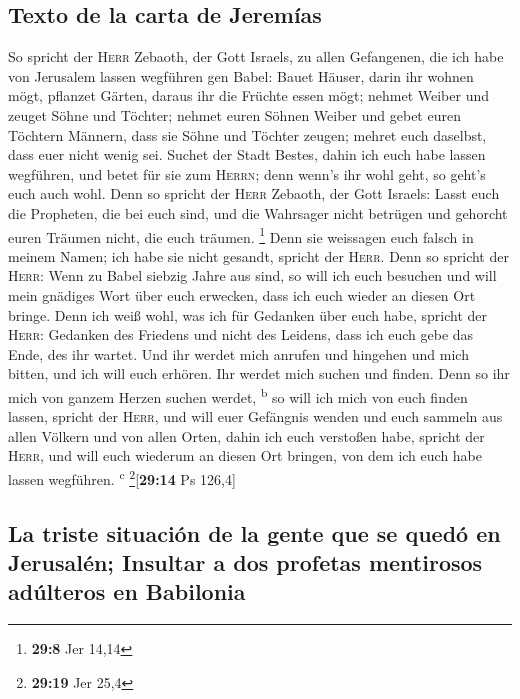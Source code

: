 \hypertarget{texto-de-la-carta-de-jeremuxedas}{%
\subsection{Texto de la carta de
Jeremías}\label{texto-de-la-carta-de-jeremuxedas}}

 So spricht der \textsc{Herr} Zebaoth, der Gott Israels,
zu allen Gefangenen, die ich habe von Jerusalem lassen wegführen gen
Babel:  Bauet Häuser, darin ihr wohnen mögt, pflanzet
Gärten, daraus ihr die Früchte essen mögt;  nehmet Weiber
und zeuget Söhne und Töchter; nehmet euren Söhnen Weiber und gebet euren
Töchtern Männern, dass sie Söhne und Töchter zeugen; mehret euch
daselbst, dass euer nicht wenig sei.  Suchet der Stadt
Bestes, dahin ich euch habe lassen wegführen, und betet für sie zum
\textsc{Herrn}; denn wenn's ihr wohl geht, so geht's euch auch wohl.
 Denn so spricht der \textsc{Herr} Zebaoth, der Gott
Israels: Lasst euch die Propheten, die bei euch sind, und die Wahrsager
nicht betrügen und gehorcht euren Träumen nicht, die euch träumen.
\footnote{\textbf{29:8} Jer 14,14}  Denn sie weissagen
euch falsch in meinem Namen; ich habe sie nicht gesandt, spricht der
\textsc{Herr}.  Denn so spricht der \textsc{Herr}: Wenn
zu Babel siebzig Jahre aus sind, so will ich euch besuchen und will mein
gnädiges Wort über euch erwecken, dass ich euch wieder an diesen Ort
bringe.  Denn ich weiß wohl, was ich für Gedanken über
euch habe, spricht der \textsc{Herr}: Gedanken des Friedens und nicht
des Leidens, dass ich euch gebe das Ende, des ihr wartet.
 Und ihr werdet mich anrufen und hingehen und mich
bitten, und ich will euch erhören.  Ihr werdet mich
suchen und finden. Denn so ihr mich von ganzem Herzen suchen werdet,
\textsuperscript{b}  so will ich mich von euch finden
lassen, spricht der \textsc{Herr}, und will euer Gefängnis wenden und
euch sammeln aus allen Völkern und von allen Orten, dahin ich euch
verstoßen habe, spricht der \textsc{Herr}, und will euch wiederum an
diesen Ort bringen, von dem ich euch habe lassen wegführen.
\textsuperscript{c} \footnote{\textbf{29:19} Jer 25,4}{[}\textbf{29:14}
Ps 126,4{]}

\hypertarget{la-triste-situaciuxf3n-de-la-gente-que-se-queduxf3-en-jerusaluxe9n-insultar-a-dos-profetas-mentirosos-aduxfalteros-en-babilonia}{%
\subsection{La triste situación de la gente que se quedó en Jerusalén;
Insultar a dos profetas mentirosos adúlteros en
Babilonia}\label{la-triste-situaciuxf3n-de-la-gente-que-se-queduxf3-en-jerusaluxe9n-insultar-a-dos-profetas-mentirosos-aduxfalteros-en-babilonia}}

